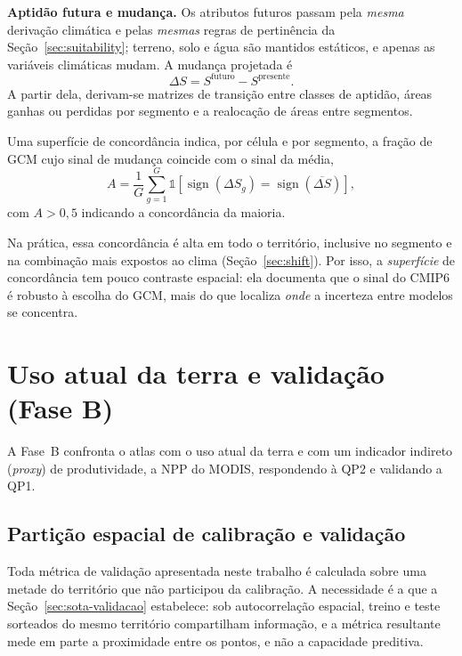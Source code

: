 \textbf{Aptidão futura e mudança.} Os atributos futuros passam pela \emph{mesma} derivação
climática e pelas \emph{mesmas} regras de pertinência da Seção~\ref{sec:suitability}; terreno, solo e
água são mantidos estáticos, e apenas as variáveis climáticas mudam. A mudança projetada é
\begin{equation*}
  \Delta S = S^{\text{futuro}} - S^{\text{presente}}.
\end{equation*}
A partir dela, derivam-se matrizes de transição entre classes de aptidão, áreas ganhas ou perdidas por
segmento e a realocação de áreas entre segmentos.

Uma superfície de concordância indica, por célula e por segmento, a
fração de GCM cujo sinal de mudança coincide com o sinal da média,
\begin{equation*}
  A = \frac{1}{G}\sum_{g=1}^{G}
   \mathbb{1}\!\left[\operatorname{sign}(\Delta S_g) = \operatorname{sign}(\overline{\Delta S})\right],
\end{equation*}
com $A > 0{,}5$ indicando a concordância da maioria.

Na prática, essa concordância é alta em todo o território, inclusive no segmento e na
combinação mais expostos ao clima (Seção~\ref{sec:shift}). Por isso, a \emph{superfície} de
concordância tem pouco contraste espacial: ela documenta que o sinal do CMIP6 é robusto à escolha do
GCM, mais do que localiza \emph{onde} a incerteza entre modelos se concentra.

\section{Uso atual da terra e validação (Fase B)}\label{sec:phaseb}

A Fase~B confronta o atlas com o uso atual da terra e com um indicador indireto (\emph{proxy}) de
produtividade, a NPP do MODIS, respondendo à QP2 e validando a QP1.

\subsection{Partição espacial de calibração e validação}\label{sec:holdout}

Toda métrica de validação apresentada neste trabalho é calculada sobre uma metade do
território que não participou da calibração. A necessidade é a que a Seção~\ref{sec:sota-validacao}
estabelece: sob autocorrelação espacial, treino e teste sorteados do mesmo território compartilham
informação, e a métrica resultante mede em parte a proximidade entre os pontos, e não a capacidade
preditiva.

